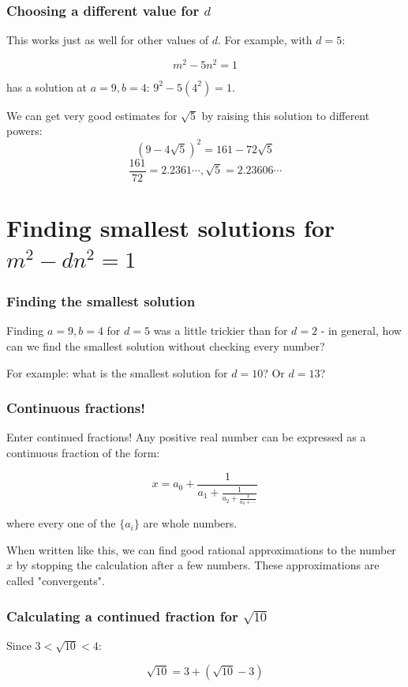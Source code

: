 \documentclass[t]{beamer}
\begin{document}
\begin{frame}
        \frametitle{Choosing a different value for $d$}

	This works just as well for other values of $d$. For example,
	with $d=5$:

	\[ m^2 - 5n^2 = 1 \]

	has a solution at $a=9,b=4$: $9^2 - 5(4^2) = 1$.

	We can get very good estimates for $\sqrt{5}$ by raising this solution 
	to different powers:
	\[ (9-4\sqrt{5})^2 = 161 - 72\sqrt{5} \]
	\[ \frac{161}{72} = 2.2361\cdots, \sqrt{5} = 2.23606\cdots \]
\end{frame}

\section{Finding smallest solutions for $m^2-dn^2=1$}

\begin{frame}
        \frametitle{Finding the smallest solution}

	Finding $a=9,b=4$ for $d=5$ was a little trickier than for $d=2$ - in
	general, how can we find the smallest solution without checking every number?

	\vspace{1em}
	For example: what is the smallest solution for $d=10$? Or $d=13$?
\end{frame}

\begin{frame}
	\frametitle{Continuous fractions!}

	Enter continued fractions! Any positive real number can be expressed as a
	continuous fraction of the form:

	\[ x = a_0 + \frac{1}{a_1 + \frac{1}{a_2+\frac{1}{a_3+\cdots}}} \]

	where every one of the $\{a_i\}$ are whole numbers.

	\vspace{1em}
	When written like this, we can find good rational approximations to the
	number $x$ by stopping the calculation after a few numbers. These
	approximations are called "convergents".
\end{frame}

\begin{frame}
	\frametitle{Calculating a continued fraction for $\sqrt{10}$}

	Since $3 < \sqrt{10} < 4$:

	\[ \sqrt{10} = 3 + (\sqrt{10} - 3) \]

\end{frame}
\end{document}

